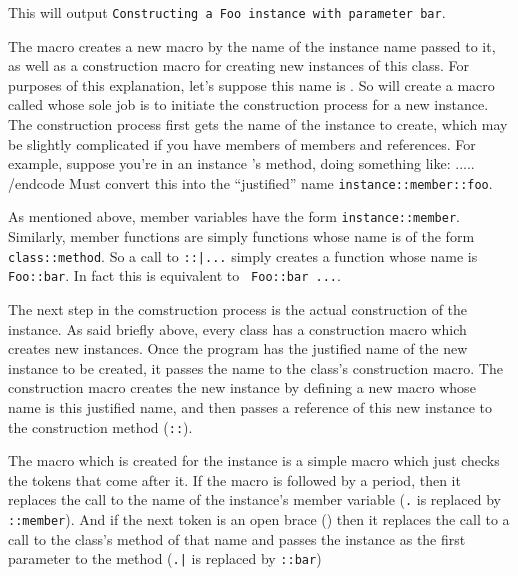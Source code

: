 This will output {\tt Constructing a Foo instance with parameter bar}.

\beginscare
The {\tt\string\class} macro creates a new macro by the name of the instance name passed to it, as well
as a construction macro for creating new instances of this class.
For purposes of this explanation, let's suppose this name is {\tt\string\Foo}.
So {\tt\string\class\string\Foo} will create a macro called {\tt\string\Foo} whose sole job is to initiate
the construction process for a new {\tt\string\Foo} instance.
The construction process first gets the name of the instance to create, which may be slightly complicated
if you have members of members and references.
For example, suppose you're in an instance {\tt\string\instance}'s method, doing something like:
\begincode
\Foo\self.\member.\foo ...
/endcode
Must convert this into the ``justified'' name {\tt instance::member::foo}.

As mentioned above, member variables have the form {\tt instance::member}.
Similarly, member functions are simply functions whose name is of the form {\tt class::method}.
So a call to {\tt\string\method\string\Foo::\string\bar ...} simply creates a function whose name is
{\tt Foo::bar}.
In fact this is equivalent to
{\tt\string\expandafter\string\function\string\csname\ Foo::bar\string\endcsname\ ...}.

The next step in the comstruction process is the actual construction of the instance.
As said briefly above, every class has a construction macro which creates new instances.
Once the program has the justified name of the new instance to be created, it passes the name to the class's
construction macro.
The construction macro creates the new instance by defining a new macro whose name is this justified name,
and then passes a reference of this new instance to the construction method ({\tt\string\Foo::\string\Foo}).

The macro which is created for the instance is a simple macro which just checks the tokens that come after
it.
If the macro is followed by a period, then it replaces the call to the name of the instance's member variable
({\tt\string\foo.\string\member} is replaced by {\tt\string\foo::member}).
And if the next token is an open brace ({\tt\lbrace}) then it replaces the call to a call to the class's
method of that name and passes the instance as the first parameter to the method
({\tt\string\foo.\string\bar\lbrace\rbrace} is replaced by {\tt\string\Foo::bar\lbrace\string\foo\rbrace})
\endscare

